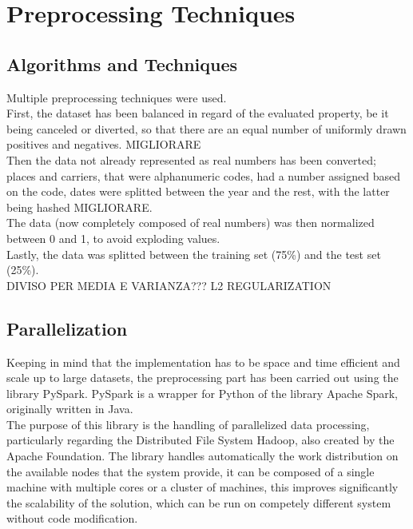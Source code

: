 \documentclass[
	letterpaper, %
	10pt, %
]{class}
\begin{document}

\section{Preprocessing Techniques}

\subsection{Algorithms and Techniques}

Multiple preprocessing techniques were used.\\
First, the dataset has been balanced in regard of the evaluated property, be it being canceled or diverted, so that there are an equal number of uniformly drawn positives and negatives. MIGLIORARE\\
Then the data not already represented as real numbers has been converted; places and carriers, that were alphanumeric codes, had a number assigned based on the code, dates were splitted between the year and the rest, with the latter being hashed MIGLIORARE.\\
The data (now completely composed of real numbers) was then normalized between 0 and 1, to avoid exploding values.\\
Lastly, the data was splitted between the training set (75\%) and the test set (25\%).\\

DIVISO PER MEDIA E VARIANZA??? L2 REGULARIZATION

\subsection{Parallelization}

Keeping in mind that the implementation has to be space and time efficient and scale up to large datasets, the preprocessing part has been carried out using the library PySpark.
PySpark is a wrapper for Python of the library Apache Spark, originally written in Java.\\

The purpose of this library is the handling of parallelized data processing, particularly regarding the Distributed File System Hadoop, also created by the Apache Foundation.
The library handles automatically the work distribution on the available nodes that the system provide, it can be composed of a single machine with multiple cores or a cluster of machines, this improves significantly the scalability of the solution, which can be run on competely different system without code modification.\\
\end{document}
